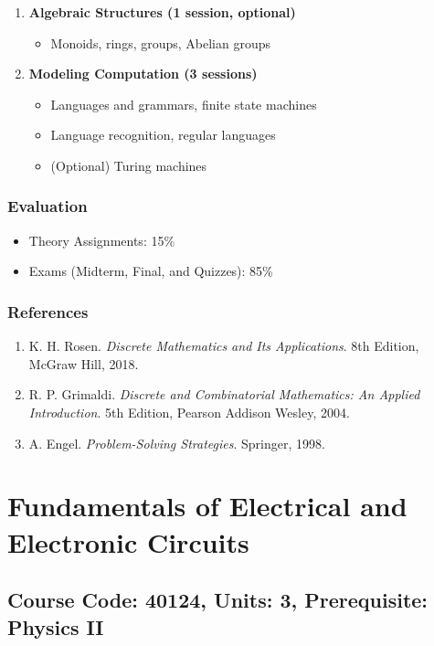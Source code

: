 \documentclass[12pt]{article}
\begin{document}
\begin{enumerate}
\begin{itemize}
    \end{itemize}
    \item \textbf{Algebraic Structures (1 session, optional)}
    \begin{itemize}
        \item Monoids, rings, groups, Abelian groups
    \end{itemize}
    \item \textbf{Modeling Computation (3 sessions)}
    \begin{itemize}
        \item Languages and grammars, finite state machines
        \item Language recognition, regular languages
        \item (Optional) Turing machines
    \end{itemize}
\end{enumerate}

\subsubsection*{Evaluation}
\begin{itemize}
    \item Theory Assignments: 15\%
    \item Exams (Midterm, Final, and Quizzes): 85\%
\end{itemize}

\subsubsection*{References}
\begin{enumerate}
    \item K. H. Rosen. \textit{Discrete Mathematics and Its Applications}. 8th Edition, McGraw Hill, 2018.
    \item R. P. Grimaldi. \textit{Discrete and Combinatorial Mathematics: An Applied Introduction}. 5th Edition, Pearson Addison Wesley, 2004.
    \item A. Engel. \textit{Problem-Solving Strategies}. Springer, 1998.
\end{enumerate}

\newpage

\section{Fundamentals of Electrical and Electronic Circuits}
\subsection*{Course Code: 40124, Units: 3, Prerequisite: Physics II}
\end{document}
